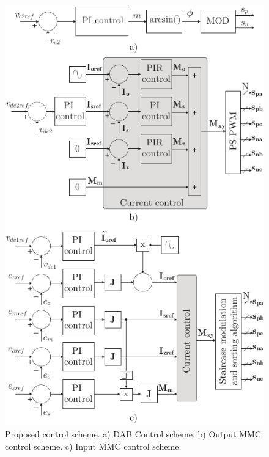 \documentclass[conference]{IEEEtran}
\begin{document}
\begin{figure}[!t]
\centering
\includegraphics[width=\columnwidth]{images/Control2.pdf}
\caption{Proposed control scheme. a) DAB Control scheme. b) Output MMC control scheme. c) Input MMC control scheme.}
\label{fig:control}
\end{figure}
\end{document}
